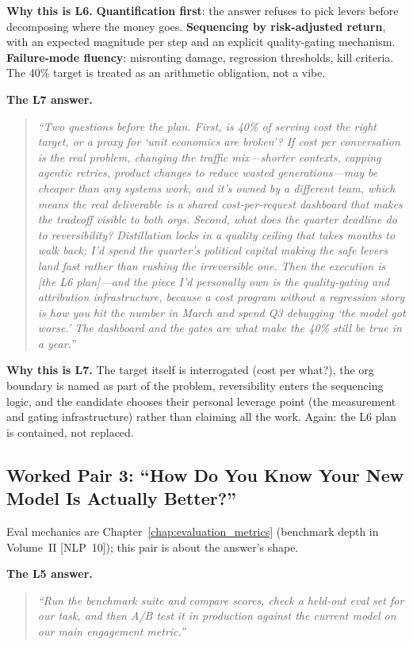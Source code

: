 \textbf{Why this is L6.} \textbf{Quantification first}: the answer refuses to pick levers before decomposing where the money goes. \textbf{Sequencing by risk-adjusted return}, with an expected magnitude per step and an explicit quality-gating mechanism. \textbf{Failure-mode fluency}: misrouting damage, regression thresholds, kill criteria. The 40\% target is treated as an arithmetic obligation, not a vibe.

\textbf{The L7 answer.}
\begin{quote}\itshape
``Two questions before the plan. First, is 40\% of serving cost the right target, or a proxy for `unit economics are broken'? If cost per conversation is the real problem, changing the traffic mix---shorter contexts, capping agentic retries, product changes to reduce wasted generations---may be cheaper than any systems work, and it's owned by a different team, which means the real deliverable is a shared cost-per-request dashboard that makes the tradeoff visible to both orgs. Second, what does the quarter deadline do to reversibility? Distillation locks in a quality ceiling that takes months to walk back; I'd spend the quarter's political capital making the safe levers land fast rather than rushing the irreversible one. Then the execution is [the L6 plan]---and the piece I'd personally own is the quality-gating and attribution infrastructure, because a cost program without a regression story is how you hit the number in March and spend Q3 debugging `the model got worse.' The dashboard and the gates are what make the 40\% still be true in a year.''
\end{quote}

\textbf{Why this is L7.} The target itself is interrogated (cost per what?), the org boundary is named as part of the problem, reversibility enters the sequencing logic, and the candidate chooses their personal leverage point (the measurement and gating infrastructure) rather than claiming all the work. Again: the L6 plan is contained, not replaced.

\subsection{Worked Pair 3: ``How Do You Know Your New Model Is Actually Better?''}

Eval mechanics are Chapter~\ref{chap:evaluation_metrics} (benchmark depth in Volume~II [NLP~10]); this pair is about the answer's shape.

\textbf{The L5 answer.}
\begin{quote}\itshape
``Run the benchmark suite and compare scores, check a held-out eval set for our task, and then A/B test it in production against the current model on our main engagement metric.''
\end{quote}

